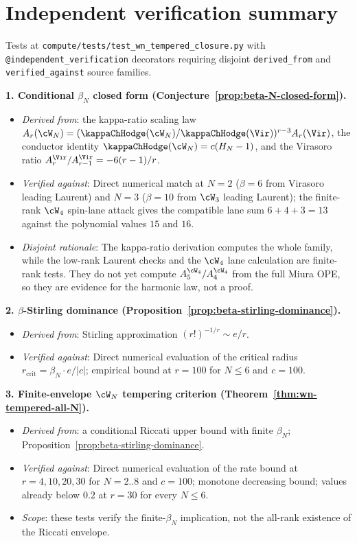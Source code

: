 \section{Independent verification summary}
\label{sec:wn-tempered-closure-iv-summary}

Tests at \texttt{compute/tests/test\_wn\_tempered\_closure.py}
with \texttt{@independent\_verification} decorators requiring
disjoint \texttt{derived\_from} and \texttt{verified\_against}
source families.

\textbf{1. Conditional $\beta_N$ closed form
(Conjecture~\ref{prop:beta-N-closed-form}).}
\begin{itemize}[nosep]
\item \emph{Derived from}: the kappa-ratio scaling law
 $A_r(\cW_N)=(\kappaChHodge(\cW_N)/\kappaChHodge(\Vir))^{r-3}A_r(\Vir)$, the
 conductor identity $\kappaChHodge(\cW_N)=c(H_N-1)$, and the Virasoro ratio
 $A_r^{\Vir}/A_{r-1}^{\Vir}=-6(r-1)/r$.
\item \emph{Verified against}: Direct numerical match at $N = 2$
 ($\beta = 6$ from Virasoro leading Laurent) and $N = 3$ ($\beta =
 10$ from $\cW_3$ leading Laurent); the finite-rank $\cW_4$ spin-lane
 attack gives the compatible lane sum $6+4+3=13$ against the polynomial
 values $15$ and $16$.
\item \emph{Disjoint rationale}: The kappa-ratio derivation computes
 the whole family, while the low-rank Laurent checks and the
 $\cW_4$ lane calculation are finite-rank tests. They do not yet
 compute $A_5^{\cW_4}/A_4^{\cW_4}$ from the full Miura OPE, so they are
 evidence for the harmonic law, not a proof.
\end{itemize}

\textbf{2. $\beta$-Stirling dominance
(Proposition~\ref{prop:beta-stirling-dominance}).}
\begin{itemize}[nosep]
\item \emph{Derived from}: Stirling approximation $(r!)^{-1/r} \sim
 e/r$.
\item \emph{Verified against}: Direct numerical evaluation of the
 critical radius $r_{\mathrm{crit}} = \beta_N \cdot e / |c|$; empirical
 bound at $r = 100$ for $N \le 6$ and $c = 100$.
\end{itemize}

\textbf{3. Finite-envelope $\cW_N$ tempering criterion
(Theorem~\ref{thm:wn-tempered-all-N}).}
\begin{itemize}[nosep]
\item \emph{Derived from}: a conditional Riccati upper bound with finite
 $\beta_N$; Proposition~\ref{prop:beta-stirling-dominance}.
\item \emph{Verified against}: Direct numerical evaluation of the rate
 bound at $r = 4, 10, 20, 30$ for $N = 2..8$ and $c = 100$; monotone
 decreasing bound; values already below $0.2$ at $r = 30$ for
 every $N \le 6$.
\item \emph{Scope}: these tests verify the finite-\(\beta_N\) implication,
 not the all-rank existence of the Riccati envelope.
\end{itemize}

